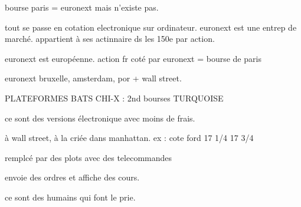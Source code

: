 \documentclass[a4paper,12pt]{article}
\begin{document}
bourse paris = euronext mais n'existe pas.

tout se passe en cotation electronique sur ordinateur.
euronext est une entrep de marché. appartient à ses actinnaire ds les 150e par action.

euronext est européenne.
action fr coté par euronext = bourse de paris

euronext bruxelle, amsterdam, por + wall street.
 
 
 PLATEFORMES
 BATS
 CHI-X : 2nd bourses 
 TURQUOISE
 
 ce sont des versions électronique avec moins de frais.
 
 à wall street, à la criée dans manhattan.
 ex : cote ford 17 1/4  
 17 3/4
 
 remplcé par des plots avec des telecommandes
 
 envoie des ordres et affiche des cours.
 
 ce sont des humains qui font le prie.
  
%
%

\newpage
\nocite{*}  %


%
%
%
%
\end{document}
